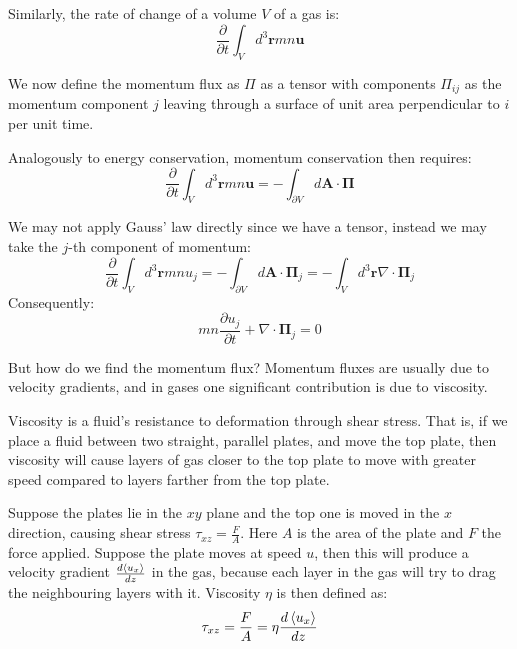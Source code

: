 \documentclass[a4paper,11pt,oneside]{book}
\newcommand{\BF}[1]{\boldsymbol{#1}}
\begin{document}
Similarly, the rate of change of a volume $V$ of a gas is:
\begin{equation}
    \frac{\partial}{\partial t}\int_V d^3 \BF{r} mn\BF{u}
\end{equation}

We now define the momentum flux as $\Pi$ as a tensor with components $\Pi_{ij}$ as the momentum component $j$ leaving through a surface of unit area perpendicular to $i$ per unit time. 


Analogously to energy conservation, momentum conservation then requires:
\begin{equation}
     \frac{\partial}{\partial t}\int_V d^3 \BF{r} mn\BF{u} = - \int_{\partial V} d\BF{A} \cdot \BF{\Pi} 
\end{equation}

We may not apply Gauss' law directly since we have a tensor, instead we may take the $j$-th component of momentum:
\begin{equation}
     \frac{\partial}{\partial t}\int_V d^3 \BF{r} mnu_j = - \int_{\partial V} d\BF{A} \cdot \BF{\Pi}_j = -\int_V d^3 \BF{r} \nabla \cdot \BF{\Pi}_j 
\end{equation}
Consequently:
\begin{equation}
    mn  \frac{\partial u_j}{\partial t}  + \nabla \cdot \BF{\Pi}_j = 0
\end{equation}

But how do we find the momentum flux? Momentum fluxes are usually due to velocity gradients, and in gases one significant contribution is due to viscosity. 


Viscosity is a fluid's resistance to deformation through shear stress. That is, if we place a fluid between two straight, parallel plates, and move the top plate, then viscosity will cause layers of gas closer to the top plate to move with greater speed compared to layers farther from the top plate. 

Suppose the plates lie in the $xy$ plane and the top one is moved in the $x$ direction, causing shear stress $\tau_{xz}=\frac{F}{A}$. Here $A$ is the area of the plate and $F$ the force applied. Suppose the plate moves at speed $u$, then this will produce a velocity gradient $\frac{d\braket{u_x}}{dz}$ in the gas, because each layer in the gas will try to drag the neighbouring layers with it. Viscosity $\eta$ is then defined as:
\begin{equation}
    \tau_{xz} = \frac{F}{A} = \eta \frac{d \braket{u_x}}{dz}
\end{equation}
\end{document}
